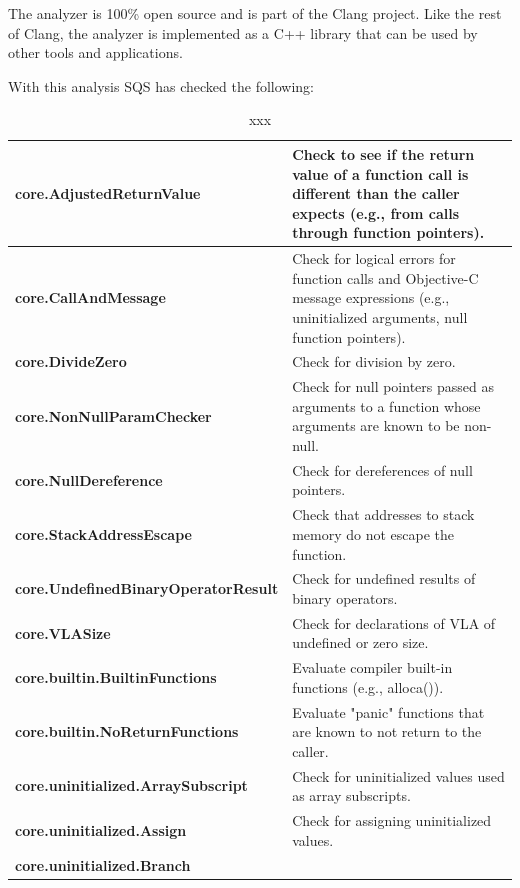 The analyzer is 100\% open source and is part of the Clang project. Like the rest of Clang, the analyzer is implemented as a C++ library that can be used by other tools and applications.

With this analysis SQS has checked the following:

{\footnotesize\sffamily\centering
  \begin{longtable}{||p{}|p{}||}
  \caption{xxx}\\
    \hline\hline
    \hline\hline
    \endhead
    \hline\hline
    \endfoot
    \textbf{core.AdjustedReturnValue}
& Check to see if the return value of a function call is different than the caller expects (e.g., from calls through function pointers).
    \\
    \hline
    \textbf{core.CallAndMessage}
& Check for logical errors for function calls and Objective-C message expressions (e.g., uninitialized arguments, null function pointers).
    \\
    \hline
    \textbf{core.DivideZero}
& Check for division by zero.
    \\
    \hline
    \textbf{core.NonNullParamChecker}
& Check for null pointers passed as arguments to a function whose arguments are known to be non-null.
    \\
    \hline
    \textbf{core.NullDereference}
& Check for dereferences of null pointers.
    \\
    \hline
    \textbf{core.StackAddressEscape}
& Check that addresses to stack memory do not escape the function.
    \\
    \hline
    \textbf{core.UndefinedBinaryOperatorResult}
& Check for undefined results of binary operators.
    \\
    \hline
    \textbf{core.VLASize}
& Check for declarations of VLA of undefined or zero size.
    \\
    \hline
    \textbf{core.builtin.BuiltinFunctions}
& Evaluate compiler built-in functions (e.g., alloca()).
    \\
    \hline
    \textbf{core.builtin.NoReturnFunctions}
& Evaluate "panic" functions that are known to not return to the caller.
    \\
    \hline
    \textbf{core.uninitialized.ArraySubscript}
& Check for uninitialized values used as array subscripts.
    \\
    \hline
    \textbf{core.uninitialized.Assign}
& Check for assigning uninitialized values.
    \\
    \hline
    \textbf{core.uninitialized.Branch}

\end{longtable}}
